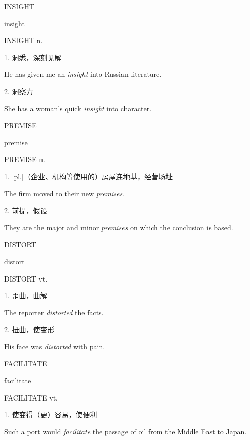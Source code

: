 \begin{flashcard}{
INSIGHT

insight
}
\begin{center}
INSIGHT n. 
\end{center}
1. 洞悉，深刻见解

He has given me an \textit{insight} into Russian literature.

2. 洞察力

She has a woman's quick \textit{insight} into character.

\end{flashcard}
\begin{flashcard}{
PREMISE

premise
}
\begin{center}
PREMISE n. 
\end{center}
1. [pl.]（企业、机构等使用的）房屋连地基，经营场址

The firm moved to their new \textit{premises}.

2. 前提，假设

They are the major and minor \textit{premises} on which the conclusion is based.

\end{flashcard}
\begin{flashcard}{
DISTORT

distort
}
\begin{center}
DISTORT vt. 
\end{center}
1. 歪曲，曲解

The reporter \textit{distorted} the facts.

2. 扭曲，使变形

His face was \textit{distorted} with pain.

\end{flashcard}
\begin{flashcard}{
FACILITATE

facilitate
}
\begin{center}
FACILITATE vt. 
\end{center}
1. 使变得（更）容易，使便利

Such a port would \textit{facilitate} the passage of oil from the Middle East to Japan.

\end{flashcard}
